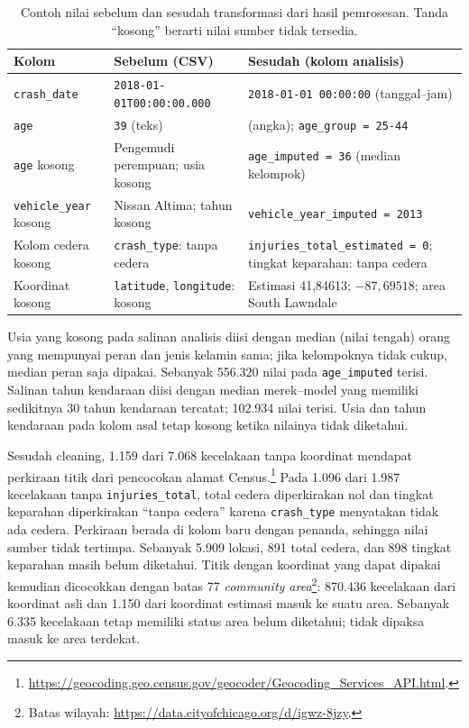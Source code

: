 \documentclass[10pt,a4paper]{article}
\begin{document}
\begin{table}[H]
\centering\footnotesize
\caption{Contoh nilai sebelum dan sesudah transformasi dari hasil pemrosesan. Tanda ``kosong'' berarti nilai sumber tidak tersedia.}
\begin{tabularx}{\linewidth}{p{2.6cm}
>{\raggedright\arraybackslash}X
>{\raggedright\arraybackslash}X}
\toprule
Kolom & Sebelum (CSV) & Sesudah (kolom analisis)\\
\midrule
\texttt{crash\_date} & \texttt{2018-01-01T00:00:00.000} & \texttt{2018-01-01 00:00:00} (tanggal--jam)\\
\texttt{age} & \texttt{39} (teks) & 39 (angka); \texttt{age\_group = 25-44}\\
\texttt{age} kosong & Pengemudi perempuan; usia kosong & \texttt{age\_imputed = 36} (median kelompok)\\
\texttt{vehicle\_year} kosong & Nissan Altima; tahun kosong & \texttt{vehicle\_year\_imputed = 2013}\\
Kolom cedera kosong & \texttt{crash\_type}: tanpa cedera & \texttt{injuries\_total\_estimated = 0}; tingkat keparahan: tanpa cedera\\
Koordinat kosong & \texttt{latitude}, \texttt{longitude}: kosong & Estimasi 41,84613; $-87,69518$; area South Lawndale\\
\bottomrule
\end{tabularx}
\end{table}

Usia yang kosong pada salinan analisis diisi dengan median (nilai tengah) orang yang
mempunyai peran dan jenis kelamin sama; jika kelompoknya tidak cukup,
median peran saja dipakai. Sebanyak 556.320 nilai pada
\texttt{age\_imputed} terisi. Salinan tahun kendaraan diisi dengan median
merek--model yang memiliki sedikitnya 30 tahun kendaraan tercatat;
102.934 nilai terisi. Usia dan tahun kendaraan pada kolom asal tetap kosong
ketika nilainya tidak diketahui.

Sesudah cleaning, 1.159 dari 7.068 kecelakaan tanpa koordinat mendapat
perkiraan titik dari pencocokan alamat Census.\footnote{
\url{https://geocoding.geo.census.gov/geocoder/Geocoding_Services_API.html}.}
Pada 1.096 dari 1.987 kecelakaan tanpa \texttt{injuries\_total}, total
cedera diperkirakan nol dan tingkat keparahan diperkirakan ``tanpa cedera''
karena \texttt{crash\_type} menyatakan tidak ada cedera. Perkiraan berada
di kolom baru dengan penanda, sehingga nilai sumber tidak tertimpa.
Sebanyak 5.909 lokasi, 891 total cedera, dan 898 tingkat keparahan
masih belum diketahui.
Titik dengan koordinat yang dapat dipakai kemudian dicocokkan dengan batas
77 \emph{community area}\footnote{Batas wilayah:
\url{https://data.cityofchicago.org/d/igwz-8jzy}.}:
870.436 kecelakaan dari koordinat asli dan 1.150
dari koordinat estimasi masuk ke suatu area. Sebanyak 6.335 kecelakaan
tetap memiliki status area belum diketahui; tidak dipaksa masuk ke area
terdekat.
\end{document}
